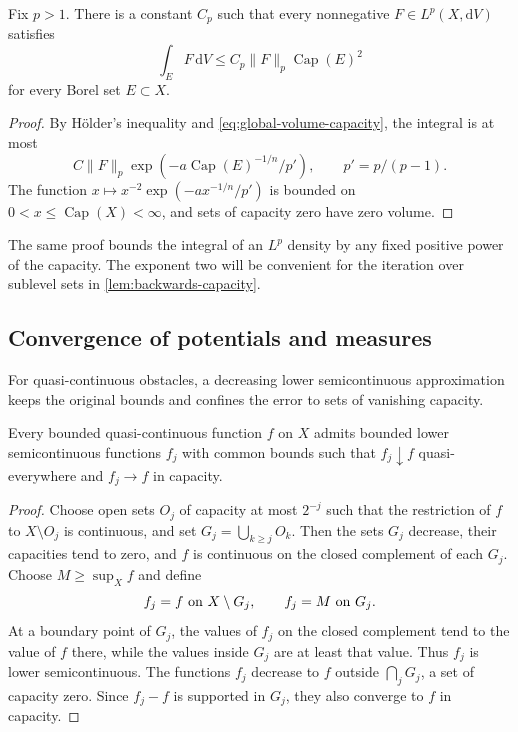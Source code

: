\begin{corollary}\label{cor:lp-capacity-square}
Fix $p>1$. There is a constant $C_p$ such that every nonnegative $F\in L^p(X,\mathrm{d}V)$ satisfies
\[
 \int_E F\,\mathrm{d}V\leq C_p\|F\|_p\operatorname{Cap}(E)^2
\]
for every Borel set $E\subset X$.
\end{corollary}
\begin{proof}
By H\"older's inequality and \eqref{eq:global-volume-capacity}, the integral is at most
\[
 C\|F\|_p\exp(-a\operatorname{Cap}(E)^{-1/n}/p'),
 \qquad p'=p/(p-1).
\]
The function $x\mapsto x^{-2}\exp(-ax^{-1/n}/p')$ is bounded on $0<x\leq\operatorname{Cap}(X)<\infty$, and sets of capacity zero have zero volume.
\end{proof}

The same proof bounds the integral of an $L^p$ density by any fixed positive power of the capacity. The exponent two will be convenient for the iteration over sublevel sets in \cref{lem:backwards-capacity}.





\subsection{Convergence of potentials and measures}

For quasi-continuous obstacles, a decreasing lower semicontinuous approximation keeps the original bounds and confines the error to sets of vanishing capacity.

\begin{lemma}
\label{lem:quasicont-lsc-approximation}
Every bounded quasi-continuous function $f$ on $X$ admits bounded lower semicontinuous functions $f_j$ with common bounds such that $f_j\downarrow f$ quasi-everywhere and $f_j\to f$ in capacity.
\end{lemma}
\begin{proof}
Choose open sets $O_j$ of capacity at most $2^{-j}$ such that the restriction of $f$ to $X\setminus O_j$ is continuous, and set $G_j=\bigcup_{k\geq j}O_k$. Then the sets $G_j$ decrease, their capacities tend to zero, and $f$ is continuous on the closed complement of each $G_j$. Choose $M\geq\sup_Xf$ and define
\[
 f_j=f\ \hbox{on }X\setminus G_j,\qquad f_j=M\ \hbox{on }G_j.
\]
At a boundary point of $G_j$, the values of $f_j$ on the closed complement tend to the value of $f$ there, while the values inside $G_j$ are at least that value. Thus $f_j$ is lower semicontinuous. The functions $f_j$ decrease to $f$ outside $\bigcap_jG_j$, a set of capacity zero. Since $f_j-f$ is supported in $G_j$, they also converge to $f$ in capacity.
\end{proof}

